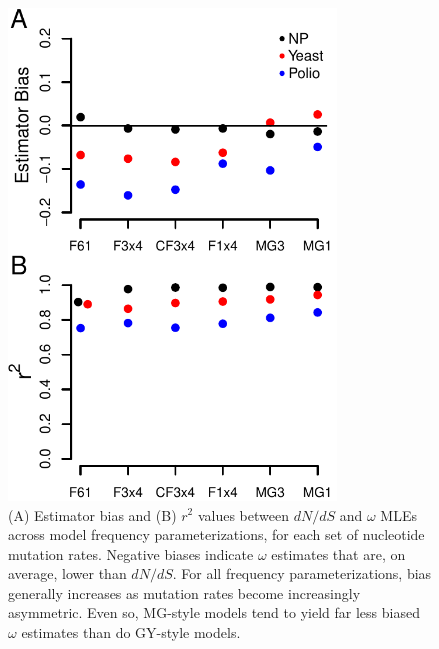 \documentclass[11pt]{article}
\begin{document}
\begin{figure}[htbp]
	\centerline{\includegraphics[width=8.7cm]{figures/MainText/nyp_bias_r2.pdf}}
	\caption{\label{nyp_bias_r2} (A) Estimator bias and (B) $r^2$ values between $dN/dS$ and $\omega$ MLEs across model frequency parameterizations, for each set of nucleotide mutation rates. Negative biases indicate $\omega$ estimates that are, on average, lower than $dN/dS$. For all frequency parameterizations, bias generally increases as mutation rates become increasingly asymmetric. Even so, MG-style models tend to yield far less biased $\omega$ estimates than do GY-style models.}	
\end{figure}

\vspace{2cm}
\end{document}
